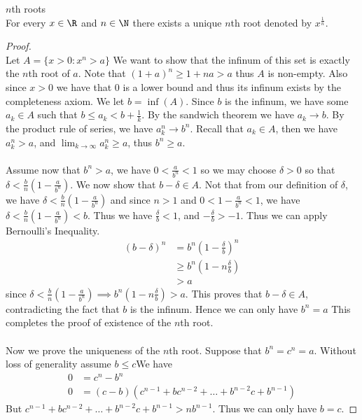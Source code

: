 \documentclass[a4paper]{article}
\begin{document}
\begin{prp}{$n$th roots}{}\\
For every $x\in\R$ and $n\in\N$ there exists a unique $n$th root denoted by $x^\frac{1}{n}$. 
\begin{proof}\\ Let $A=\{x>0:x^n>a\}$ We want to show that the infinum of this set is exactly the $n$th root of $a$. Note that $(1+a)^n\geq1+na>a$ thus $A$ is non-empty. Also since $x>0$ we have that $0$ is a lower bound and thus its infinum exists by the completeness axiom. We let $b=\inf(A)$. Since $b$ is the infinum, we have some $a_k\in A$ such that $b\leq a_k<b+\frac{1}{k}$. By the sandwich theorem we have $a_k\to b$. By the product rule of series, we have $a_k^n\to b^n$. Recall that $a_k\in A$, then we have $a_k^n>a$, and $\lim_{k\to\infty}a_k^n\geq a$, thus $b^n\geq a$. \\~\\
Assume now that $b^n>a$, we have $0<\frac{a}{b^n}<1$ so we may choose $\delta>0$ so that $\delta<\frac{b}{n}(1-\frac{a}{b^n})$. We now show that $b-\delta\in A$. Not that from our definition of $\delta$, we have $\delta<\frac{b}{n}(1-\frac{a}{b^n})$ and since $n>1$ and $0<1-\frac{a}{b^n}<1$, we have $\delta<\frac{b}{n}\left(1-\frac{a}{b^n}\right)<b$. Thus we have $\frac{\delta}{b}<1$, and $-\frac{\delta}{b}>-1$. Thus we can apply Bernoulli's Inequality. 
\begin{align*}
(b-\delta)^n&=b^n\left(1-\frac{\delta}{b}\right)^n \\
&\geq b^n\left(1-n\frac{\delta}{b}\right) \tag{By Bernoulli's Inequality} \\
&>a
\end{align*}
since $\delta<\frac{b}{n}\left(1-\frac{a}{b^n}\right)\implies b^n\left(1-n\frac{\delta}{b}\right)>a$. This proves that $b-\delta\in A$, contradicting the fact that $b$ is the infinum. Hence we can only have $b^n=a$ This completes the proof of existence of the $n$th root.\\~\\
Now we prove the uniqueness of the $n$th root. Suppose that $b^n=c^n=a$. Without loss of generality assume $b\leq c$We have
\begin{align*}
0&=c^n-b^n \\
0&=(c-b)(c^{n-1}+bc^{n-2}+\dots+b^{n-2}c+b^{n-1})
\end{align*}
But $c^{n-1}+bc^{n-2}+\dots+b^{n-2}c+b^{n-1}>nb^{n-1}$. Thus we can only have $b=c$. 
\end{proof}
\end{prp}
\end{document}
